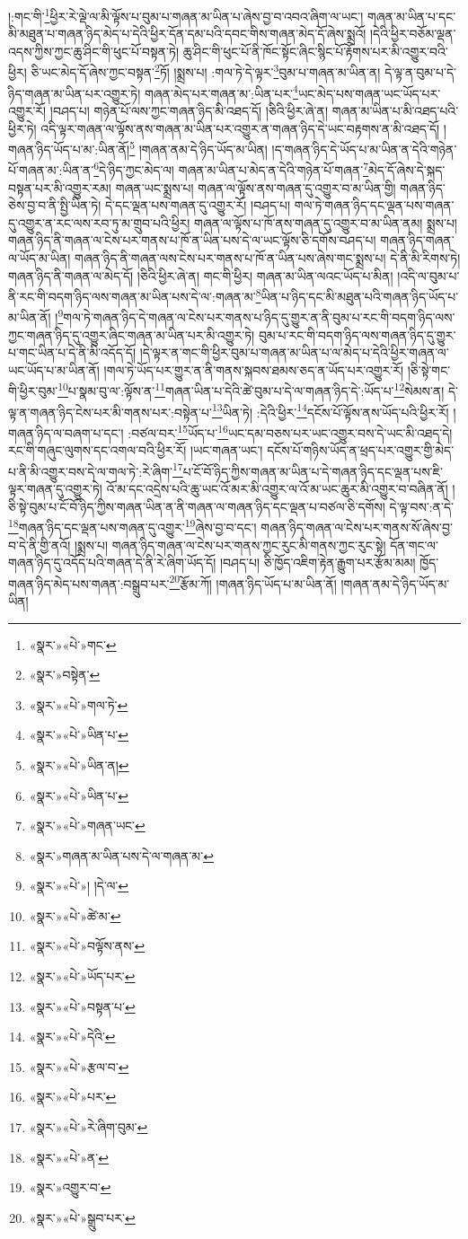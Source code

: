 །:གང་གི་\footnote{«སྣར་»«པེ་»གང་}ཕྱིར་རེ་ལྡེ་ལ་མི་ལྟོས་པ་བུམ་པ་གཞན་མ་ཡིན་པ་ཞེས་བྱ་བ་འབའ་ཞིག་ལ་ཡང་། གཞན་མ་ཡིན་པ་དང་མི་མཐུན་པ་གཞན་ཉིད་མེད་པ་དེའི་ཕྱིར་དོན་དམ་པའི་དབང་གིས་གཞན་མེད་དོ་ཞེས་སྨྲའོ། །དེའི་ཕྱིར་བཅོམ་ལྡན་འདས་ཀྱིས་ཀྱང་ཆུ་ཤིང་གི་ཕུང་པོ་བསྟན་ཏེ། ཆུ་ཤིང་གི་ཕུང་པོ་ནི་ཁོང་སྟོང་ཞིང་སྙིང་པོ་རྟོགས་པར་མི་འགྱུར་བའི་ཕྱིར། ཅི་ཡང་མེད་དོ་ཞེས་ཀྱང་བསྟན་\footnote{«སྣར་»བསྟེན་}ཏོ། །སྨྲས་པ། :གལ་ཏེ་དེ་ལྟར་\footnote{«སྣར་»«པེ་»གལ་ཏེ་}བུམ་པ་གཞན་མ་ཡིན་ན། དེ་ལྟ་ན་བུམ་པ་དེ་ཉིད་གཞན་མ་ཡིན་པར་འགྱུར་ཏེ། གཞན་མེད་པར་གཞན་མ་:ཡིན་པར་\footnote{«སྣར་»«པེ་»ཡིན་པ་}ཡང་མེད་པས་གཞན་ཡང་ཡོད་པར་འགྱུར་རོ། །བཤད་པ། གཉེན་པོ་ལས་ཀྱང་གཞན་ཉིད་མི་འཐད་དོ། །ཅིའི་ཕྱིར་ཞེ་ན། གཞན་མ་ཡིན་པ་མི་འཐད་པའི་ཕྱིར་ཏེ། འདི་ལྟར་གཞན་ལ་ལྟོས་ནས་གཞན་མ་ཡིན་པར་འགྱུར་ན་གཞན་ཉིད་དེ་ཡང་བརྟགས་ན་མི་འཐད་དོ། །གཞན་ཉིད་ཡོད་པ་མ་:ཡིན་ནོ།\footnote{«སྣར་»«པེ་»ཡིན་ན།} །གཞན་ནམ་དེ་ཉིད་ཡོད་མ་ཡིན། །ད་གཞན་ཉིད་དེ་ཡོད་པ་མ་ཡིན་ན་དེའི་གཉེན་པོ་གཞན་མ་:ཡིན་ན་\footnote{«སྣར་»«པེ་»ཡིན་པ་}དེ་ཉིད་ཀྱང་མེད་ལ། གཞན་མ་ཡིན་པ་མེད་ན་དེའི་གཉེན་པོ་གཞན་\footnote{«སྣར་»«པེ་»གཞན་ཡང་}མེད་དོ་ཞེས་དེ་སྐད་བསྟན་པར་མི་འགྱུར་རམ། གཞན་ཡང་སྨྲས་པ། གཞན་ལ་ལྟོས་ནས་གཞན་དུ་འགྱུར་བ་མ་ཡིན་གྱི། གཞན་ཉིད་ཅེས་བྱ་བ་ནི་སྤྱི་ཡིན་ཏེ། དེ་དང་ལྡན་པས་གཞན་དུ་འགྱུར་རོ། །བཤད་པ། གལ་ཏེ་གཞན་ཉིད་དང་ལྡན་པས་གཞན་དུ་འགྱུར་ན་རང་ལས་རབ་ཏུ་མ་གྲུབ་པའི་ཕྱིར། གཞན་ལ་ལྟོས་པ་ཁོ་ནས་གཞན་དུ་འགྱུར་བ་མ་ཡིན་ནམ། སྨྲས་པ། གཞན་ཉིད་ནི་གཞན་ལ་ངེས་པར་གནས་པ་ཁོ་ན་ཡིན་པས་དེ་ལ་ཡང་ལྟོས་ཅི་དགོས་བཤད་པ། གཞན་ཉིད་གཞན་ལ་ཡོད་མ་ཡིན། གཞན་ཉིད་ནི་གཞན་ལས་ངེས་པར་གནས་པ་ཁོ་ན་ཡིན་པས་ཞེས་གང་སྨྲས་པ། དེ་ནི་མི་རིགས་ཏེ། གཞན་ཉིད་ནི་གཞན་ལ་མེད་དོ། །ཅིའི་ཕྱིར་ཞེ་ན། གང་གི་ཕྱིར། གཞན་མ་ཡིན་ལའང་ཡོད་པ་མིན། །འདི་ལ་བུམ་པ་ནི་རང་གི་བདག་ཉིད་ལས་གཞན་མ་ཡིན་པས་དེ་ལ་:གཞན་མ་\footnote{«སྣར་»གཞན་མ་ཡིན་པས་དེ་ལ་གཞན་མ་}ཡིན་པ་ཉིད་དང་མི་མཐུན་པའི་གཞན་ཉིད་ཡོད་པ་མ་ཡིན་ནོ། །\footnote{«སྣར་»«པེ་»། །དེ་ལ་}གལ་ཏེ་གཞན་ཉིད་དེ་གཞན་ལ་ངེས་པར་གནས་པ་ཉིད་དུ་གྱུར་ན་ནི་བུམ་པ་རང་གི་བདག་ཉིད་ལས་ཀྱང་གཞན་ཉིད་དུ་འགྱུར་ཞིང་གཞན་མ་ཡིན་པར་མི་འགྱུར་ཏེ། བུམ་པ་རང་གི་བདག་ཉིད་ལས་གཞན་ཉིད་དུ་གྱུར་པ་གང་ཡིན་པ་དེ་ནི་མི་འདོད་དོ། །དེ་ལྟར་ན་གང་གི་ཕྱིར་བུམ་པ་གཞན་མ་ཡིན་པ་ལ་མེད་པ་དེའི་ཕྱིར་གཞན་ལ་ཡང་ཡོད་པ་མ་ཡིན་ནོ། །གལ་ཏེ་ཡོད་པར་གྱུར་ན་ནི་གནས་སྐབས་ཐམས་ཅད་ན་ཡོད་པར་འགྱུར་རོ། །ཅི་སྟེ་གང་གི་ཕྱིར་བུམ་\footnote{«སྣར་»«པེ་»ཚེ་མ་}པ་སྣམ་བུ་ལ་:ལྟོས་ན་\footnote{«སྣར་»«པེ་»བལྟོས་ནས་}གཞན་ཡིན་པ་དེའི་ཚེ་བུམ་པ་དེ་ལ་གཞན་ཉིད་དེ་:ཡོད་པ་\footnote{«སྣར་»«པེ་»ཡོད་པར་}སེམས་ན། དེ་ལྟ་ན་གཞན་ཉིད་ངེས་པར་མི་གནས་པར་:བསྟེན་པ་\footnote{«སྣར་»«པེ་»བསྟན་པ་}ཡིན་ཏེ། :དེའི་ཕྱིར་\footnote{«སྣར་»«པེ་»དེའི་}དངོས་པོ་ལྟོས་ནས་ཡོད་པའི་ཕྱིར་རོ། །གཞན་ཉིད་ལ་བཞག་པ་དང་། :བཙལ་བར་\footnote{«སྣར་»«པེ་»རྩལ་བ་}ཡོད་པ་\footnote{«སྣར་»«པེ་»པར་}ཡང་དམ་བཅས་པར་ཡང་འགྱུར་བས་དེ་ཡང་མི་འཐད་དེ། རང་གི་གཞུང་ལུགས་དང་འགལ་བའི་ཕྱིར་རོ། །ཡང་གཞན་ཡང་། དངོས་པོ་གཉིས་ཡོད་ན་ཕྲད་པར་འགྱུར་གྱི་མེད་པ་ནི་མི་འགྱུར་བས་དེ་ལ་གལ་ཏེ་:རེ་ཞིག་\footnote{«སྣར་»«པེ་»རེ་ཞིག་བུམ་}པ་ངོ་བོ་ཉིད་ཀྱིས་གཞན་མ་ཡིན་པ་དེ་གཞན་ཉིད་དང་ལྡན་པས་ཇི་ལྟར་གཞན་དུ་འགྱུར་ཏེ། འོ་མ་དང་འདྲེས་པའི་ཆུ་ཡང་འོ་མར་མི་འགྱུར་ལ་འོ་མ་ཡང་ཆུར་མི་འགྱུར་བ་བཞིན་ནོ། །ཅི་སྟེ་བུམ་པ་ངོ་བོ་ཉིད་ཀྱིས་གཞན་ཡིན་ན་ནི་གཞན་ལ་གཞན་ཉིད་དང་ལྡན་པ་བཙལ་ཅི་དགོས། དེ་ལྟ་བས་:ན་དེ་\footnote{«སྣར་»«པེ་»ན་}གཞན་ཉིད་དང་ལྡན་པས་གཞན་དུ་འགྱུར་\footnote{«སྣར་»འགྱུར་བ་}ཞེས་བྱ་བ་དང་། གཞན་ཉིད་གཞན་ལ་ངེས་པར་གནས་སོ་ཞེས་བྱ་བ་དེ་ནི་གྱི་ནའོ། །སྨྲས་པ། གཞན་ཉིད་གཞན་ལ་ངེས་པར་གནས་ཀྱང་རུང་མི་གནས་ཀྱང་རུང་སྟེ། དོན་གང་ལ་གཞན་ཉིད་དུ་འདོད་པའི་གཞན་དེ་ནི་རེ་ཞིག་ཡོད་དོ། །བཤད་པ། ཅི་ཁྱོད་འཇིག་རྟེན་རྒྱུག་པར་རྩོམ་མམ། ཁྱོད་གཞན་ཉིད་མེད་པས་གཞན་:བསྒྲུབ་པར་\footnote{«སྣར་»«པེ་»སྒྲུབ་པར་}རྩོམ་ཀོ། །གཞན་ཉིད་ཡོད་པ་མ་ཡིན་ནོ། །གཞན་ནམ་དེ་ཉིད་ཡོད་མ་ཡིན། 
